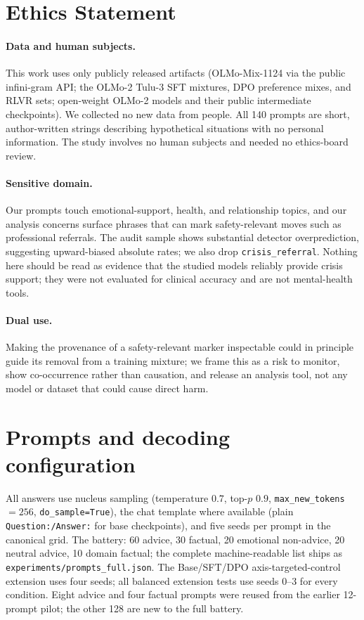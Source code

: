 \documentclass[11pt]{article}
\begin{document}
\section*{Ethics Statement}

\paragraph{Data and human subjects.} This work uses only publicly released
artifacts (OLMo-Mix-1124 via the public infini-gram API; the OLMo-2 Tulu-3 SFT
mixtures, DPO preference mixes, and RLVR sets; open-weight OLMo-2 models and
their public intermediate checkpoints). We collected no new data from people.
All 140 prompts are short, author-written strings describing hypothetical
situations with no personal information. The study involves no human subjects
and needed no ethics-board review.

\paragraph{Sensitive domain.} Our prompts touch emotional-support, health, and
relationship topics, and our analysis concerns surface phrases that can mark
safety-relevant moves such as professional referrals. The audit sample shows substantial detector
overprediction, suggesting upward-biased absolute rates; we also drop
\texttt{crisis\_referral}. Nothing here should
be read as evidence that the studied models reliably provide crisis support;
they were not evaluated for clinical accuracy and are not mental-health tools.

\paragraph{Dual use.} Making the provenance of a safety-relevant marker inspectable
could in principle guide its removal from a training mixture; we frame this as
a risk to monitor, show co-occurrence rather than causation, and release an
analysis tool, not any model or dataset that could cause direct harm.



\appendix

\section{Prompts and decoding configuration}
\label{app:prompts}

All answers use nucleus sampling (temperature $0.7$, top-$p$ $0.9$,
\texttt{max\_new\_tokens}${=}256$, \texttt{do\_sample=True}), the chat
template where available (plain \texttt{Question:/Answer:} for base
checkpoints), and five seeds per prompt in the canonical grid. The battery: 60 advice, 30 factual,
20 emotional non-advice, 20 neutral advice, 10 domain factual; the complete
machine-readable list ships as \texttt{experiments/prompts\_full.json}. The
Base/SFT/DPO axis-targeted-control extension uses four seeds; all balanced
extension tests use seeds 0--3 for every condition. Eight advice and four
factual prompts were reused from the earlier 12-prompt pilot; the other 128 are
new to the full battery.
\end{document}
